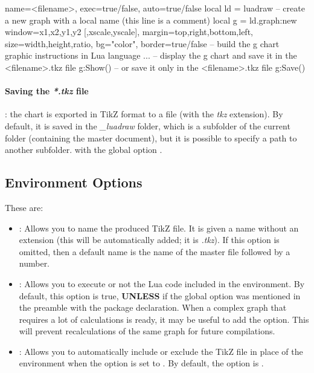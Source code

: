 \begin{TeXcode}
\begin{luadraw}{ name=<filename>, exec=true/false, auto=true/false }
local ld = luadraw
-- create a new graph with a local name (this line is a comment)
local g = ld.graph:new{ window={x1,x2,y1,y2 [,xscale,yscale]}, margin={top,right,bottom,left},
size={width,height,ratio}, bg="color", border=true/false }
-- build the g chart
graphic instructions in Lua language ...
-- display the g chart and save it in the <filename>.tkz file
g:Show()
-- or save it only in the <filename>.tkz file
g:Save()
\end{luadraw}
\end{TeXcode}

\paragraph{Saving the \emph{*.tkz} file}: the chart is exported in TikZ format to a file (with the \emph{tkz} extension). By default, it is saved in the \emph{\_luadraw} folder, which is a subfolder of the current folder (containing the master document), but it is possible to specify a path to another subfolder. with the global option .

\subsection{\luadrawenv Environment Options}

These are:
\begin{itemize}
    \item {}: Allows you to name the produced TikZ file. It is given a name without an extension (this will be automatically added; it is \emph{.tkz}). If this option is omitted, then a default name is the name of the master file followed by a number.

    \item {}: Allows you to execute or not the Lua code included in the environment. By default, this option is true, \textbf{UNLESS} if the global option  was mentioned in the preamble with the package declaration. When a complex graph that requires a lot of calculations is ready, it may be useful to add the  option. This will prevent recalculations of the same graph for future compilations.

    \item {}: Allows you to automatically include or exclude the TikZ file in place of the \luadrawenv environment when the  option is set to \false. By default, the  option is \true.

\end{itemize}

